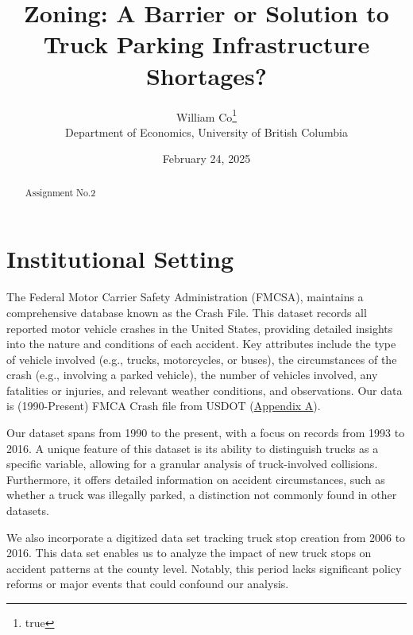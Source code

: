 \documentclass[
  8pt,
  12pt]{article}
\begin{document}
\def\spacingset#1{\renewcommand{\baselinestretch}%
{#1}\small\normalsize} \spacingset{1}



\date{February 24, 2025}
\title{\bf Zoning: A Barrier or Solution to Truck Parking Infrastructure
Shortages?}
\author{
William Co\thanks{true}\\
Department of Economics, University of British Columbia\\
}
\maketitle

\bigskip
\bigskip
\begin{abstract}
Assignment No.2
\end{abstract}


\newpage
\spacingset{1.9} %

\section{Institutional Setting}\label{institutional-setting}

The Federal Motor Carrier Safety Administration (FMCSA), maintains a
comprehensive database known as the Crash File. This dataset records all
reported motor vehicle crashes in the United States, providing detailed
insights into the nature and conditions of each accident. Key attributes
include the type of vehicle involved (e.g., trucks, motorcycles, or
buses), the circumstances of the crash (e.g., involving a parked
vehicle), the number of vehicles involved, any fatalities or injuries,
and relevant weather conditions, and observations. Our data is
(1990-Present) FMCA Crash file from USDOT
(\label{sec:appendix-a}\hyperref[sec-a.-visualization-of-dataset.-]{Appendix
A}).

Our dataset spans from 1990 to the present, with a focus on records from
1993 to 2016. A unique feature of this dataset is its ability to
distinguish trucks as a specific variable, allowing for a granular
analysis of truck-involved collisions. Furthermore, it offers detailed
information on accident circumstances, such as whether a truck was
illegally parked, a distinction not commonly found in other datasets.

We also incorporate a digitized data set tracking truck stop creation
from 2006 to 2016. This data set enables us to analyze the impact of new
truck stops on accident patterns at the county level. Notably, this
period lacks significant policy reforms or major events that could
confound our analysis.
\end{document}
